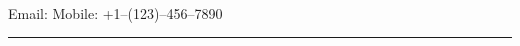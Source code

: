 \documentclass[]{custom-resume}
\begin{document}
  \vspace*{0.1cm} \\
  \indent Email: 
  \hspace{0.5cm} Mobile: +1--(123)--456--7890 \\
  \noindent \textcolor{HeadingColor}{\rule{\textwidth}{1pt}}
\end{document}
